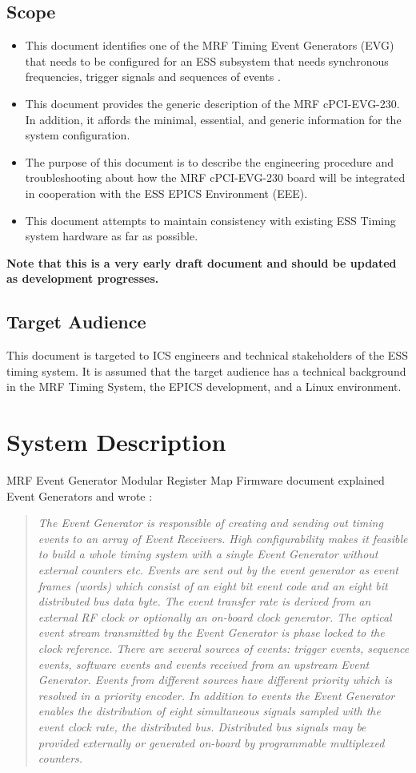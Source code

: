 \documentclass[11pt
  , a4paper
  , article
  , oneside
  , showtrims
]{memoir}
\begin{document}
\section{Scope}
\begin{itemize}
\item This document identifies one of the MRF Timing Event Generators (EVG) that needs to be configured for an ESS subsystem that needs synchronous frequencies, trigger signals and sequences of events \cite{MRFEVENTGENERATOR}.
\item This document provides the generic description of the MRF cPCI-EVG-230. In addition, it affords the minimal, essential, and generic information for the system configuration.  
\item The purpose of this document is to describe the engineering procedure and troubleshooting about how the MRF cPCI-EVG-230 board will be integrated in cooperation with the ESS EPICS Environment (EEE).
\item This document attempts to maintain consistency with existing ESS Timing system hardware as far as possible. 
\end{itemize}
\textbf{Note that this is a very early draft document and should be updated as development progresses.}

\section{Target Audience}
This document is targeted to ICS engineers and technical stakeholders of the ESS timing system. It is assumed that the target audience has a technical background in the MRF Timing System, the EPICS development, and a Linux environment.

\chapter{System Description}
MRF Event Generator Modular Register Map Firmware document \citep[see][p4]{MRFEVENTGENERATOR} explained Event Generators and wrote :
\blockquote{\textit{The Event Generator is responsible of creating and sending out timing events to an array of Event Receivers.
High configurability makes it feasible to build a whole timing system with a single Event Generator without external counters etc.
Events are sent out by the event generator as event frames (words) which consist of an eight bit event code and an eight bit distributed bus data byte. The event transfer rate is derived from an external RF clock or optionally an on-board clock generator. The optical event stream transmitted by the Event Generator is phase locked to the clock reference.
There are several sources of events: trigger events, sequence events, software events and events received from an upstream Event Generator. Events from different sources have different priority which is resolved in a priority encoder.
In addition to events the Event Generator enables the distribution of eight simultaneous signals sampled with the event clock rate, the distributed bus. Distributed bus signals may be provided externally or generated on-board by programmable multiplexed counters.}}
\end{document}

